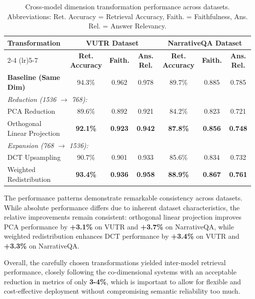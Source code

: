 \documentclass[10pt,twocolumn,letterpaper]{article}
\begin{document}
\begin{table}[!ht]
\caption{Cross‑model dimension transformation performance across datasets. Abbreviations: Ret. Accuracy = Retrieval Accuracy, Faith. = Faithfulness, Ans. Rel. = Answer Relevancy.}
\centering
\begin{tabular}{lcccccc}
\toprule
\textbf{Transformation} & \multicolumn{3}{c}{\textbf{VUTR Dataset}} & \multicolumn{3}{c}{\textbf{NarrativeQA Dataset}} \\
\cmidrule(lr){2-4} \cmidrule(lr){5-7}
& \textbf{Ret. Accuracy} & \textbf{Faith.} & \textbf{Ans. Rel.} & \textbf{Ret. Accuracy} & \textbf{Faith.} & \textbf{Ans. Rel.} \\
\midrule
\textbf{Baseline (Same Dim)} & 94.3\% & 0.962 & 0.978 & 89.7\% & 0.885 & 0.785 \\
\midrule
\multicolumn{7}{l}{\textit{Reduction (1536 $\rightarrow$ 768):}} \\
PCA Reduction & 89.6\% & 0.892 & 0.921 & 84.2\% & 0.823 & 0.721 \\
Orthogonal Linear Projection & \textbf{92.1\%} & \textbf{0.923} & \textbf{0.942} & \textbf{87.8\%} & \textbf{0.856} & \textbf{0.748} \\
\midrule
\multicolumn{7}{l}{\textit{Expansion (768 $\rightarrow$ 1536):}} \\
DCT Upsampling & 90.7\% & 0.901 & 0.933 & 85.6\% & 0.834 & 0.732 \\
Weighted Redistribution & \textbf{93.4\%} & \textbf{0.936} & \textbf{0.958} & \textbf{88.9\%} & \textbf{0.867} & \textbf{0.761} \\
\bottomrule
\end{tabular}
\label{tab:cross_model_embedding_combined}
\end{table}

\vspace{0.5em}
The performance patterns demonstrate remarkable consistency across datasets. While absolute performance differs due to inherent dataset characteristics, the relative improvements remain consistent: orthogonal linear projection improves PCA performance by \textbf{+3.1\%} on VUTR and \textbf{+3.7\%} on NarrativeQA, while weighted redistribution enhances DCT performance by \textbf{+3.4\%} on VUTR and \textbf{+3.3\%} on NarrativeQA.

\vspace{0.5em}
Overall, the carefully chosen transformations yielded inter-model retrieval performance, closely following the co-dimensional systems with an acceptable reduction in metrics of only \textbf{3-4\%}, which is important to allow for flexible and cost-effective deployment without compromising semantic reliability too much.
\end{document}

